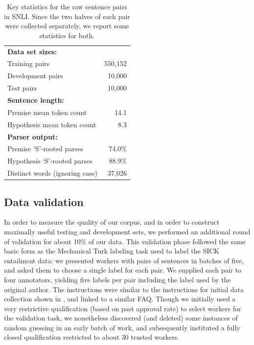 \begin{table}
\center
  \begin{tabular}{l r} 
    \toprule
\multicolumn{2}{l}{\textbf{Data set sizes:}}\\
Training pairs &  550,152\\
Development pairs &  10,000\\
Test pairs & 10,000\\
\midrule
\multicolumn{2}{l}{\textbf{Sentence length:}}\\
Premise mean token count & 14.1\\
Hypothesis mean token count & 8.3 \\
\midrule
\multicolumn{2}{l}{\textbf{Parser output:}}\\
Premise `S'-rooted parses & 74.0\%\\
Hypothesis `S'-rooted parses & 88.9\%\\
Distinct words (ignoring case) & 37,026\\
    \bottomrule
  \end{tabular}
\caption{\label{collection-stats}Key statistics for the raw sentence pairs in SNLI\@. Since the two halves of each pair were collected separately, we report some statistics for both.} 
\end{table}


\subsection{Data validation}

In order to measure the quality of our corpus, and in order to construct maximally useful testing and development sets, we performed an additional round of validation for about 10\% of our data.
This validation phase followed the same basic form as the Mechanical Turk labeling task used to label the SICK entailment data: we presented workers with pairs of sentences in batches of five, and asked them to choose a single label for each pair. We supplied each pair to four annotators, yielding five labels per pair including the label used by the original author. The instructions were similar to the instructions for initial data collection shown in , and linked to a similar FAQ\@. Though we initially used a very restrictive qualification (based on past approval rate) to select workers for the validation task, we nonetheless discovered (and deleted) some instances of random guessing in an early batch of work, and subsequently instituted a fully closed qualification restricted to about 30 trusted workers.

